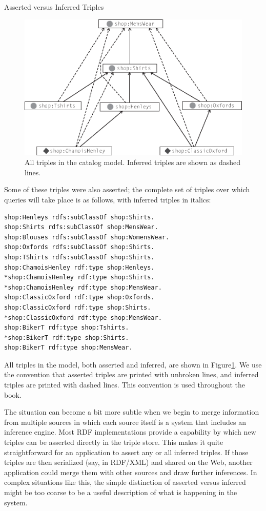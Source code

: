 \begin{example}{Asserted versus Inferred Triples}
\begin{figure}
\centering
\includegraphics[width=5in]{media/ch7/f07-03.eps}
\caption{All triples in the catalog model. Inferred triples are shown as dashed
lines.}
\label{fig:ch7.3}
\end{figure}



Some of these triples were also asserted; the complete set of triples
over which queries will take place is as follows, with inferred triples
in italics:

\begin{lstlisting}
shop:Henleys rdfs:subClassOf shop:Shirts.
shop:Shirts rdfs:subClassOf shop:MensWear.
shop:Blouses rdfs:subClassOf shop:WomensWear.
shop:Oxfords rdfs:subClassOf shop:Shirts.
shop:TShirts rdfs:subClassOf shop:Shirts.
shop:ChamoisHenley rdf:type shop:Henleys.
*shop:ChamoisHenley rdf:type shop:Shirts.
*shop:ChamoisHenley rdf:type shop:MensWear.
shop:ClassicOxford rdf:type shop:Oxfords.
shop:ClassicOxford rdf:type shop:Shirts.
*shop:ClassicOxford rdf:type shop:MensWear.
shop:BikerT rdf:type shop:Tshirts.
*shop:BikerT rdf:type shop:Shirts.
shop:BikerT rdf:type shop:MensWear.
\end{lstlisting}

All triples in the model, both asserted and inferred, are shown in
Figure\ref{fig:ch7.3}. We use the convention that asserted triples are printed with
unbroken lines, and inferred triples are printed with dashed lines. This
convention is used throughout the book.
\end{example}

The situation can become a bit more subtle when we begin to merge
information from multiple sources in which each source itself is a
system that includes an inference engine. Most RDF implementations
provide a capability by which new triples can be asserted directly in
the triple store. This makes it quite straightforward for an application
to assert any or all inferred triples. If those triples are then
serialized (say, in RDF/XML) and shared on the Web, another application
could merge them with other sources and draw further inferences. In
complex situations like this, the simple distinction of asserted versus
inferred might be too coarse to be a useful description of what is
happening in the system.

